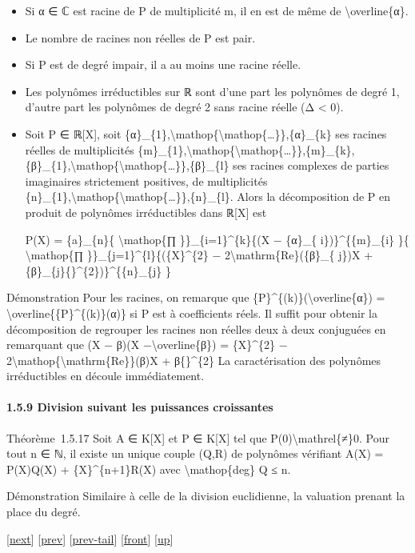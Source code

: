 \documentclass[]{article}
\begin{document}
\begin{itemize}
\item
  Si α ∈ ℂ est racine de P de multiplicité m, il en est de même de
  \textbackslash{}overline\{α\}.
\item
  Le nombre de racines non réelles de P est pair.
\item
  Si P est de degré impair, il a au moins une racine réelle.
\item
  Les polynômes irréductibles sur ℝ sont d'une part les polynômes de
  degré 1, d'autre part les polynômes de degré 2 sans racine réelle (Δ
  \textless{} 0).
\item
  Soit P ∈ ℝ{[}X{]}, soit
  \{α\}\_\{1\},\textbackslash{}mathop\{\textbackslash{}mathop\{\ldots{}\}\},\{α\}\_\{k\}
  ses racines réelles de multiplicités
  \{m\}\_\{1\},\textbackslash{}mathop\{\textbackslash{}mathop\{\ldots{}\}\},\{m\}\_\{k\},
  \{β\}\_\{1\},\textbackslash{}mathop\{\textbackslash{}mathop\{\ldots{}\}\},\{β\}\_\{l\}
  ses racines complexes de parties imaginaires strictement positives, de
  multiplicités
  \{n\}\_\{1\},\textbackslash{}mathop\{\textbackslash{}mathop\{\ldots{}\}\},\{n\}\_\{l\}.
  Alors la décomposition de P en produit de polynômes irréductibles dans
  ℝ{[}X{]} est

  P(X) = \{a\}\_\{n\}\{ \textbackslash{}mathop\{∏
  \}\}\_\{i=1\}\^{}\{k\}\{(X − \{α\}\_\{ i\})\}\^{}\{\{m\}\_\{i\} \}\{
  \textbackslash{}mathop\{∏ \}\}\_\{j=1\}\^{}\{l\}\{(\{X\}\^{}\{2\} −
  2\textbackslash{}mathrm\{Re\}(\{β\}\_\{ j\})X +
  \textbar{}\{β\}\_\{j\}\{\textbar{}\}\^{}\{2\})\}\^{}\{\{n\}\_\{j\} \}
\end{itemize}

Démonstration Pour les racines, on remarque que
\{P\}\^{}\{(k)\}(\textbackslash{}overline\{α\}) =
\textbackslash{}overline\{\{P\}\^{}\{(k)\}(α)\} si P est à coefficients
réels. Il suffit pour obtenir la décomposition de regrouper les racines
non réelles deux à deux conjuguées en remarquant que (X − β)(X
−\textbackslash{}overline\{β\}) = \{X\}\^{}\{2\} −
2\textbackslash{}mathop\{\textbackslash{}mathrm\{Re\}\}(β)X +
\textbar{}β\{\textbar{}\}\^{}\{2\} La caractérisation des polynômes
irréductibles en découle immédiatement.

\paragraph{1.5.9 Division suivant les puissances croissantes}

Théorème~1.5.17 Soit A ∈ K{[}X{]} et P ∈ K{[}X{]} tel que
P(0)\textbackslash{}mathrel\{≠\}0. Pour tout n ∈ ℕ, il existe un unique
couple (Q,R) de polynômes vérifiant A(X) = P(X)Q(X) +
\{X\}\^{}\{n+1\}R(X) avec \textbackslash{}mathop\{deg\} Q ≤ n.

Démonstration Similaire à celle de la division euclidienne, la valuation
prenant la place du degré.

{[}\href{coursse6.html}{next}{]} {[}\href{coursse4.html}{prev}{]}
{[}\href{coursse4.html\#tailcoursse4.html}{prev-tail}{]}
{[}\href{coursse5.html}{front}{]}
{[}\href{coursch2.html\#coursse5.html}{up}{]}
\end{document}

